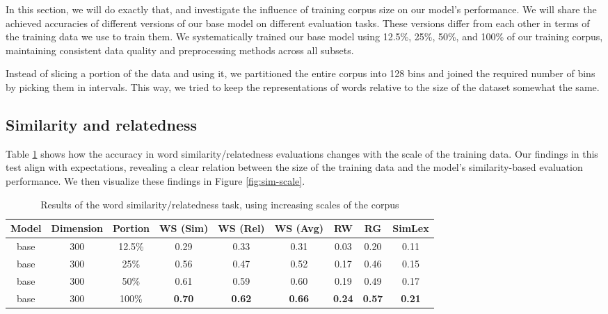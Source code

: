 In this section, we will do exactly that, and investigate the influence of training corpus size on our model's performance. We will share the achieved accuracies of different versions of our base model on different evaluation tasks. These versions differ from each other in terms of the training data we use to train them. We systematically trained our base model using 12.5\%, 25\%, 50\%, and 100\% of our training corpus, maintaining consistent data quality and preprocessing methods across all subsets. 

Instead of slicing a portion of the data and using it, we partitioned the entire corpus into 128 bins and joined the required number of bins by picking them in intervals. This way, we tried to keep the representations of words relative to the size of the dataset somewhat the same.

\subsection{Similarity and relatedness}

Table \ref{tab:sim-scale} shows how the accuracy in word similarity/relatedness evaluations changes with the scale of the training data. Our findings in this test align with expectations, revealing a clear relation between the size of the training data and the model's similarity-based evaluation performance. We then visualize these findings in Figure \ref{fig:sim-scale}.

\begin{table}[h]
\centering
\setlength\tabcolsep{3pt}
\begin{tabular}{|ccc|cccccc|}
\hline
Model & Dimension & Portion & WS (Sim) & WS (Rel) & WS (Avg) & RW & RG & SimLex \\ \hline
base & 300 & 12.5\% & 0.29 & 0.33 & 0.31 & 0.03 & 0.20 & 0.11 \\
base & 300 & 25\% & 0.56 & 0.47 & 0.52 & 0.17 & 0.46 & 0.15 \\
base & 300 & 50\% & 0.61 & 0.59 & 0.60 & 0.19 & 0.49 & 0.17 \\
base & 300 & 100\% & \textbf{0.70} & \textbf{0.62} & \textbf{0.66} & \textbf{0.24} & \textbf{0.57} & \textbf{0.21} \\ \hline
\end{tabular}
\caption{Results of the word similarity/relatedness task, using increasing scales of the corpus}
\label{tab:sim-scale}
\end{table}

